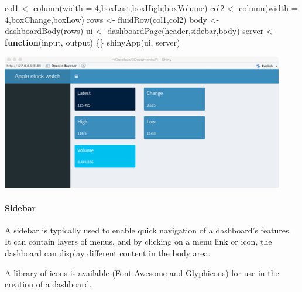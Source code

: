\documentclass[
]{article}
\newenvironment{Shaded}{\begin{snugshade}}{\end{snugshade}}
\newcommand{\AttributeTok}[1]{\textcolor[rgb]{0.77,0.63,0.00}{#1}}
\newcommand{\ControlFlowTok}[1]{\textcolor[rgb]{0.13,0.29,0.53}{\textbf{#1}}}
\newcommand{\DecValTok}[1]{\textcolor[rgb]{0.00,0.00,0.81}{#1}}
\newcommand{\FunctionTok}[1]{\textcolor[rgb]{0.00,0.00,0.00}{#1}}
\newcommand{\NormalTok}[1]{#1}
\newcommand{\OtherTok}[1]{\textcolor[rgb]{0.56,0.35,0.01}{#1}}
\begin{document}
\begin{Shaded}
\begin{Highlighting}[]
\NormalTok{col1 }\OtherTok{\textless{}{-}}  \FunctionTok{column}\NormalTok{(}\AttributeTok{width =} \DecValTok{4}\NormalTok{,boxLast,boxHigh,boxVolume)}
\NormalTok{col2 }\OtherTok{\textless{}{-}}  \FunctionTok{column}\NormalTok{(}\AttributeTok{width =} \DecValTok{4}\NormalTok{,boxChange,boxLow)}
\NormalTok{rows }\OtherTok{\textless{}{-}} \FunctionTok{fluidRow}\NormalTok{(col1,col2)}
\NormalTok{body }\OtherTok{\textless{}{-}} \FunctionTok{dashboardBody}\NormalTok{(rows)}
\NormalTok{ui }\OtherTok{\textless{}{-}} \FunctionTok{dashboardPage}\NormalTok{(header,sidebar,body)}
\NormalTok{server }\OtherTok{\textless{}{-}} \ControlFlowTok{function}\NormalTok{(input, output) \{\}}
\FunctionTok{shinyApp}\NormalTok{(ui, server)}
\end{Highlighting}
\end{Shaded}

\includegraphics{Figures/Chapter 19/dashboard-4.png}

\hypertarget{sidebar-1}{%
\paragraph*{Sidebar}\label{sidebar-1}}

A sidebar is typically used to enable quick navigation of a dashboard's
features. It can contain layers of menus, and by clicking on a menu link
or icon, the dashboard can display different content in the body area.

A library of icons is available
(\href{http://fontawesome.io/icons/}{\underline{Font-Awesome}} and
\href{http://www.apple.com}{\underline{Glyphicons}}) for use in the
creation of a dashboard.
\end{document}
